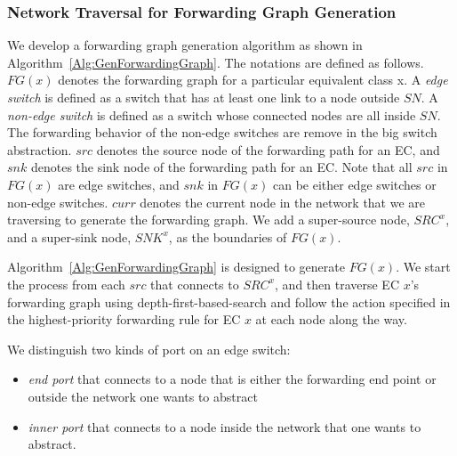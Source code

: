 \subsubsection{Network Traversal for Forwarding Graph Generation}

We develop a forwarding graph generation algorithm as shown in Algorithm~\ref{Alg:GenForwardingGraph}.
The notations are defined as follows.
$FG(x)$ denotes the forwarding graph for a particular equivalent class x.
A \textit{edge switch} is defined as a switch that has at least one link to a node outside $SN$.
A \textit{non-edge switch} is defined as a switch whose connected nodes are all inside $SN$.
The forwarding behavior of the non-edge switches are remove in the big switch abstraction.
$src$ denotes the source node of the forwarding path for an EC,
and $snk$ denotes the sink node of the forwarding path for an EC.
Note that all $src$ in $FG(x)$ are edge switches,
and $snk$ in $FG(x)$ can be either edge switches or non-edge switches.
$curr$ denotes the current node in the network that we are traversing to generate the forwarding graph.
We add a super-source node, $SRC^x$, and a super-sink node, $SNK^x$, as the boundaries of $FG(x)$.

Algorithm~\ref{Alg:GenForwardingGraph} is designed to generate $FG(x)$.
We start the process from each $src$ that connects to $SRC^x$,
and then traverse EC $x$'s forwarding graph using depth-first-based-search and
follow the action specified in the highest-priority forwarding rule for EC $x$ at each node along the way. 


We distinguish two kinds of port on an edge switch:
\begin{itemize}
\item \textit{end port} that connects to a node that is either the forwarding end point or outside the network one wants to abstract
\item \textit{inner port} that connects to a node inside the network that one wants to abstract.
\end{itemize}

